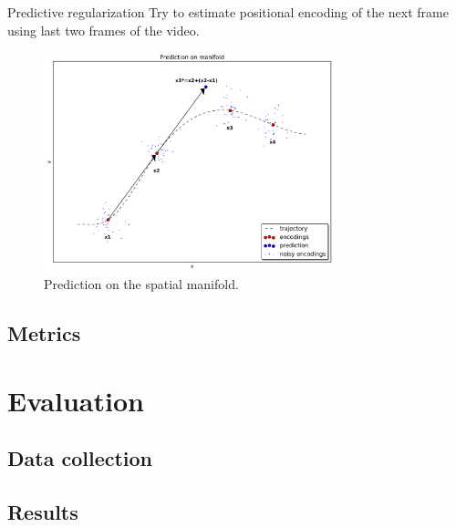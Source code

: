 \documentclass[pdftex, handout]{beamer}
\begin{document}
\begin{frame}{Predictive regularization}
  Try to estimate positional encoding of the next frame using last two frames of the video.
  \begin{figure}
    \includegraphics[width=0.75\textwidth,height=0.75\textheight,keepaspectratio]{images_main/prediction.png}
    \caption{Prediction on the spatial manifold.}
  \end{figure}
\end{frame}



\subsection{Metrics}

\begin{frame}
\end{frame}


\section{Evaluation}

\subsection{Data collection}

\begin{frame}
\end{frame}

\begin{frame}
\end{frame}


\subsection{Results}
\end{document}
